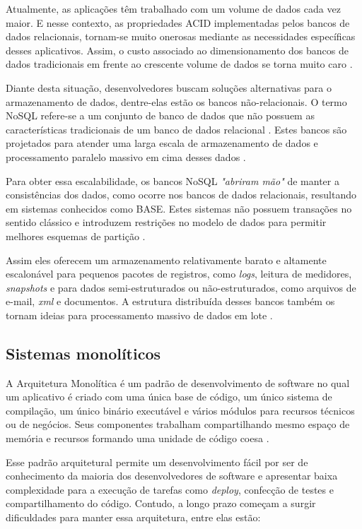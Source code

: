 Atualmente, as aplicações têm trabalhado com um volume de dados cada vez maior.
E nesse contexto, as propriedades \gls{ACID} implementadas pelos bancos de dados relacionais,
tornam-se muito onerosas mediante as necessidades específicas desses aplicativos.
Assim, o custo associado ao dimensionamento dos bancos de dados tradicionais em
frente ao crescente volume de dados se torna muito caro \cite{Gajendran}.

Diante desta situação, desenvolvedores buscam soluções alternativas para o
armazenamento de dados, dentre-elas estão os bancos não-relacionais. O termo
\gls{NoSQL} refere-se a um conjunto de banco de dados que não possuem as características
tradicionais de um banco de dados relacional \cite{Gajendran}. Estes bancos são projetados
para atender uma larga escala de armazenamento de dados e processamento paralelo
massivo em cima desses dados \cite{NewEraOfDatabases}.

Para obter essa escalabilidade, os bancos \gls{NoSQL} \textit{"abriram mão"} de
manter a consistências dos dados, como ocorre nos bancos de dados relacionais,
resultando em sistemas conhecidos como \gls{BASE}. Estes sistemas não possuem
transações no sentido clássico e introduzem restrições no modelo de dados
para permitir melhores esquemas de partição .

Assim eles oferecem um armazenamento relativamente barato e altamente escalonável
para pequenos pacotes de registros, como \textit{logs}, leitura de medidores,
\textit{snapshots} e para dados semi-estruturados ou não-estruturados, como arquivos
de e-mail, \textit{xml} e documentos. A estrutura distribuída desses bancos também
os tornam ideias para processamento massivo de dados em lote \cite{NewEraOfDatabases}.

\subsection{Sistemas monolíticos}

A Arquitetura Monolítica é um padrão de desenvolvimento de software no qual um aplicativo
é criado com uma única base de código, um único sistema de compilação, um único binário
executável e vários módulos para recursos técnicos ou de negócios. Seus componentes
trabalham compartilhando mesmo espaço de memória e recursos formando uma unidade de
código coesa \cite{NatalliaSakovich}.

Esse padrão arquitetural permite um desenvolvimento fácil por ser de conhecimento
da maioria dos desenvolvedores de software e apresentar baixa complexidade para a
execução de tarefas como \textit{deploy}, confecção de testes e compartilhamento
do código. Contudo, a longo prazo começam a surgir dificuldades para manter essa
arquitetura, entre elas estão:

